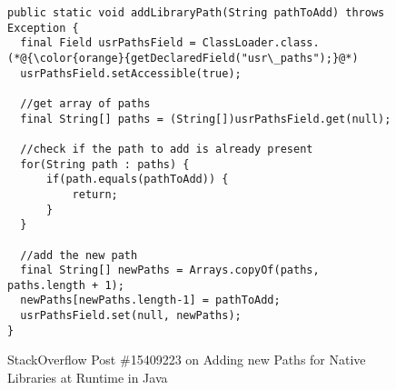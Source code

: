 \begin{figure}[t]%
	\centering
\begin{lstlisting}[]
public static void addLibraryPath(String pathToAdd) throws Exception {
  final Field usrPathsField = ClassLoader.class.(*@{\color{orange}{getDeclaredField("usr\_paths");}@*)
  usrPathsField.setAccessible(true);

  //get array of paths
  final String[] paths = (String[])usrPathsField.get(null);

  //check if the path to add is already present
  for(String path : paths) {
      if(path.equals(pathToAdd)) {
          return;
      }
  }

  //add the new path
  final String[] newPaths = Arrays.copyOf(paths, paths.length + 1);
  newPaths[newPaths.length-1] = pathToAdd;
  usrPathsField.set(null, newPaths);
}
\end{lstlisting}
        \vspace{-16pt}
        \caption{StackOverflow Post \#15409223 on Adding new Paths for
          Native Libraries at Runtime in Java}
        \label{fig:example1}
\end{figure}
